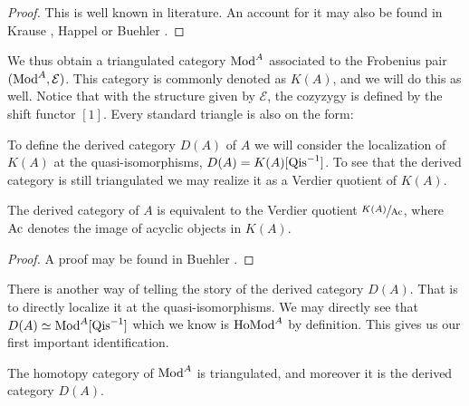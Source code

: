 \documentclass[../thesis.tex]{subfiles}
\begin{document}
            \begin{proof}
                This is well known in literature. An account for it may also be found in Krause \cite{Krause21}, Happel \cite{Happel88} or Buehler \cite{Buhler10}.
            \end{proof}

            We thus obtain a triangulated category \underline{$\tt{Mod}^A$} associated to the Frobenius pair $(\tt{Mod}^A, \mathcal{E})$. This category is commonly denoted as $K(A)$, and we will do this as well. Notice that with the structure given by $\mathcal{E}$, the cozyzygy is defined by the shift functor $[1]$. Every standard triangle is also on the form:

            \begin{center}
            \end{center}

            To define the derived category $D(A)$ of $A$ we will consider the localization of $K(A)$ at the quasi-isomorphisms, $D(A) = K(A)[\tt{Qis}^{-1}]$. To see that the derived category is still triangulated we may realize it as a Verdier quotient of $K(A)$.

            \begin{proposition}
                The derived category of $A$ is equivalent to the Verdier quotient $\sfrac{K(A)}{\tt{Ac}}$, where $\tt{Ac}$ denotes the image of acyclic objects in $K(A)$.
            \end{proposition}

            \begin{proof}
                A proof may be found in Buehler \cite{Buhler10}.
            \end{proof}

            There is another way of telling the story of the derived category $D(A)$. That is to directly localize it at the quasi-isomorphisms. We may directly see that $D(A) \simeq \tt{Mod}^A[\tt{Qis}^{-1}]$ which we know is $\tt{Ho} \tt{Mod}^A$ by definition. This gives us our first important identification.

            \begin{thm}
                The homotopy category of $\tt{Mod}^A$ is triangulated, and moreover it is the derived category $D(A)$.
            \end{thm}
\end{document}
